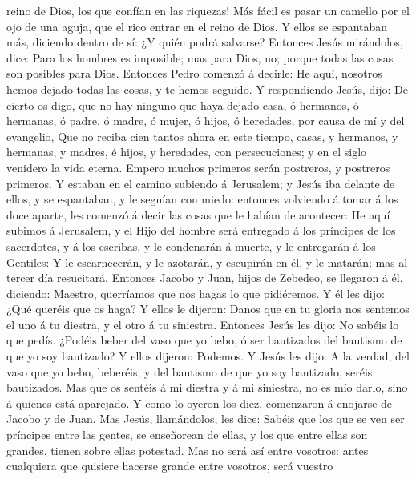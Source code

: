 reino de Dios, los que confían en las riquezas!  Más fácil
es pasar un camello por el ojo de una aguja, que el rico entrar en el
reino de Dios.  Y ellos se espantaban más, diciendo dentro
de sí: ¿Y quién podrá salvarse?  Entonces Jesús mirándolos,
dice: Para los hombres es imposible; mas para Dios, no; porque todas las
cosas son posibles para Dios.  Entonces Pedro comenzó á
decirle: He aquí, nosotros hemos dejado todas las cosas, y te hemos
seguido.  Y respondiendo Jesús, dijo: De cierto os digo,
que no hay ninguno que haya dejado casa, ó hermanos, ó hermanas, ó
padre, ó madre, ó mujer, ó hijos, ó heredades, por causa de mí y del
evangelio,  Que no reciba cien tantos ahora en este tiempo,
casas, y hermanos, y hermanas, y madres, é hijos, y heredades, con
persecuciones; y en el siglo venidero la vida eterna. 
Empero muchos primeros serán postreros, y postreros primeros.
 Y estaban en el camino subiendo á Jerusalem; y Jesús iba
delante de ellos, y se espantaban, y le seguían con miedo: entonces
volviendo á tomar á los doce aparte, les comenzó á decir las cosas que
le habían de acontecer:  He aquí subimos á Jerusalem, y el
Hijo del hombre será entregado á los príncipes de los sacerdotes, y á
los escribas, y le condenarán á muerte, y le entregarán á los Gentiles:
 Y le escarnecerán, y le azotarán, y escupirán en él, y le
matarán; mas al tercer día resucitará.  Entonces Jacobo y
Juan, hijos de Zebedeo, se llegaron á él, diciendo: Maestro, querríamos
que nos hagas lo que pidiéremos.  Y él les dijo: ¿Qué
queréis que os haga?  Y ellos le dijeron: Danos que en tu
gloria nos sentemos el uno á tu diestra, y el otro á tu siniestra.
 Entonces Jesús les dijo: No sabéis lo que pedís. ¿Podéis
beber del vaso que yo bebo, ó ser bautizados del bautismo de que yo soy
bautizado?  Y ellos dijeron: Podemos. Y Jesús les dijo: A
la verdad, del vaso que yo bebo, beberéis; y del bautismo de que yo soy
bautizado, seréis bautizados.  Mas que os sentéis á mi
diestra y á mi siniestra, no es mío darlo, sino á quienes está
aparejado.  Y como lo oyeron los diez, comenzaron á
enojarse de Jacobo y de Juan.  Mas Jesús, llamándolos, les
dice: Sabéis que los que se ven ser príncipes entre las gentes, se
enseñorean de ellas, y los que entre ellas son grandes, tienen sobre
ellas potestad.  Mas no será así entre vosotros: antes
cualquiera que quisiere hacerse grande entre vosotros, será vuestro
